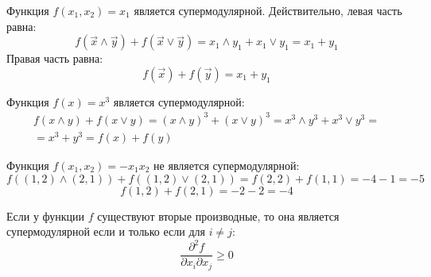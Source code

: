 \begin{myex} Функция $ f(x_{1},x_{2})=x_{1} $ является супермодулярной. Действительно, левая часть равна:
\begin{equation}
f(\vec{x}\wedge\vec{y})+f(\vec{x}\vee\vec{y})=x_{1}\wedge y_{1}+x_{1}\vee y_{1}=x_{1}+y_{1}
\end{equation}
Правая часть равна:
\begin{equation}
f(\vec{x})+f(\vec{y})=x_{1}+y_{1}
\end{equation}
\end{myex}

\begin{myex} Функция $ f(x)=x^{3} $ является супермодулярной:
\begin{multline}
f(x\wedge y)+f(x \vee y)=(x\wedge y)^{3}+(x\vee y)^{3}=x^{3}\wedge y^{3} + x^{3}\vee y^{3}=\\
=x^{3}+y^{3}=f(x)+f(y)
\end{multline}
\end{myex}

\begin{myex} Функция $ f(x_{1},x_{2})=-x_{1}x_{2} $ не является супермодулярной:
\begin{equation}
f((1,2)\wedge (2,1))+f((1,2)\vee (2,1))=f(2,2)+f(1,1)=-4-1=-5
\end{equation}
\begin{equation}
f(1,2)+f(2,1)=-2-2=-4
\end{equation}


\end{myex}




\begin{myth} Если у функции $ f $ существуют вторые производные, то она является супермодулярной если и только если для $ i\neq j $:
\label{supermod_crit}
\begin{equation}
\frac{\partial^{2}f}{\partial x_{i}\partial x_{j}}\geq 0
\end{equation}
\end{myth}

